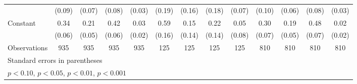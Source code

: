 {\begin{tabular}{l*{12}{c}}
                    &      (0.09)         &      (0.07)         &      (0.08)         &      (0.03)         &      (0.19)         &      (0.16)         &      (0.18)         &      (0.07)         &      (0.10)         &      (0.06)         &      (0.08)         &      (0.03)         \\
[1em]
Constant            &        0.34\sym{***}&        0.21\sym{***}&        0.42\sym{***}&        0.03         &        0.59\sym{***}&        0.15         &        0.22         &        0.05         &        0.30\sym{***}&        0.19\sym{***}&        0.48\sym{***}&        0.02         \\
                    &      (0.06)         &      (0.05)         &      (0.06)         &      (0.02)         &      (0.16)         &      (0.14)         &      (0.14)         &      (0.08)         &      (0.07)         &      (0.05)         &      (0.07)         &      (0.02)         \\
\hline
Observations        &         935         &         935         &         935         &         935         &         125         &         125         &         125         &         125         &         810         &         810         &         810         &         810         \\
\hline\hline
\multicolumn{13}{l}{\footnotesize Standard errors in parentheses}\\
\multicolumn{13}{l}{\footnotesize \sym{+} \(p<0.10\), \sym{*} \(p<0.05\), \sym{**} \(p<0.01\), \sym{***} \(p<0.001\)}\\
\end{tabular}
}
